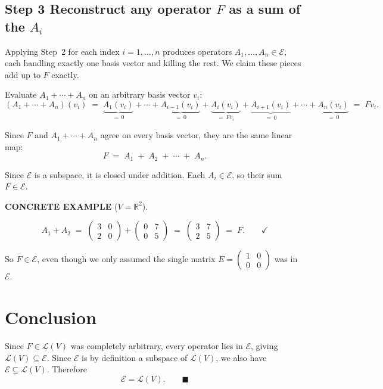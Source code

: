 \documentclass[12pt]{article}
\theoremstyle{mythmstyle}
\newenvironment{example}{%
  \vspace{8pt}
  \begin{mdframed}[backgroundcolor=examplebg, linecolor=exampleblue,
    linewidth=1.4pt, innerleftmargin=14pt, innerrightmargin=14pt,
    innertopmargin=12pt, innerbottommargin=12pt,
    skipabove=12pt, skipbelow=12pt]
  \noindent\textcolor{exampleblue}{\textbf{\small CONCRETE EXAMPLE} \normalsize($V = \mathbb{R}^2$).}\par\vspace{6pt}
}{%
  \end{mdframed}
  \vspace{6pt}
}
\begin{document}
\subsection{Step 3 \quad Reconstruct any operator $F$ as a sum of the $A_i$}

Applying Step~2 for each index $i = 1, \ldots, n$ produces operators
$A_1, \ldots, A_n \in \mathcal{E}$, each handling exactly one basis vector
and killing the rest. We claim these pieces add up to $F$ exactly.

\vspace{6pt}

Evaluate $A_1 + \cdots + A_n$ on an arbitrary basis vector $v_i$:
\[
    (A_1 + \cdots + A_n)(v_i)
    \;=\;
    \underbrace{A_1(v_i)}_{=\,0}
    + \cdots +
    \underbrace{A_{i-1}(v_i)}_{=\,0}
    +
    \underbrace{A_i(v_i)}_{=\,Fv_i}
    +
    \underbrace{A_{i+1}(v_i)}_{=\,0}
    + \cdots +
    \underbrace{A_n(v_i)}_{=\,0}
    \;=\; Fv_i.
\]

\vspace{4pt}

Since $F$ and $A_1 + \cdots + A_n$ agree on every basis vector, they are
the same linear map:
\[
    \boxed{F \;=\; A_1 \;+\; A_2 \;+\; \cdots \;+\; A_n.}
\]

Since $\mathcal{E}$ is a subspace, it is closed under addition. Each
$A_i \in \mathcal{E}$, so their sum $F \in \mathcal{E}$.

\begin{example}
\[
    A_1 + A_2
    \;=\;
    \begin{pmatrix}3&0\\2&0\end{pmatrix}
    +
    \begin{pmatrix}0&7\\0&5\end{pmatrix}
    \;=\;
    \begin{pmatrix}3&7\\2&5\end{pmatrix}
    \;=\; F. \qquad \checkmark
\]

\vspace{4pt}

So $F \in \mathcal{E}$, even though we only assumed the single matrix
$E = \begin{pmatrix}1&0\\0&0\end{pmatrix}$ was in $\mathcal{E}$.
\end{example}

\section{Conclusion}

Since $F \in \mathcal{L}(V)$ was completely arbitrary, every operator
lies in $\mathcal{E}$, giving $\mathcal{L}(V) \subseteq \mathcal{E}$.
Since $\mathcal{E}$ is by definition a subspace of $\mathcal{L}(V)$, we
also have $\mathcal{E} \subseteq \mathcal{L}(V)$. Therefore
\[
    \mathcal{E} = \mathcal{L}(V). \qquad \blacksquare
\]
\end{document}

